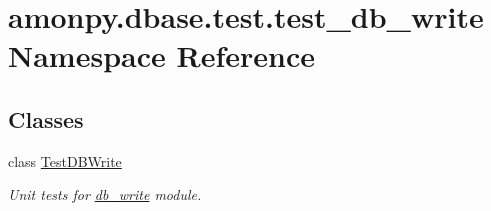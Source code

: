 \hypertarget{namespaceamonpy_1_1dbase_1_1test_1_1test__db__write}{\section{amonpy.\-dbase.\-test.\-test\-\_\-db\-\_\-write Namespace Reference}
\label{namespaceamonpy_1_1dbase_1_1test_1_1test__db__write}
}
\subsection*{Classes}
\begin{DoxyCompactItemize}
\item 
class \hyperlink{classamonpy_1_1dbase_1_1test_1_1test__db__write_1_1_test_d_b_write}{Test\-D\-B\-Write}
\begin{DoxyCompactList}\small\item\em Unit tests for \hyperlink{namespaceamonpy_1_1dbase_1_1db__write}{db\-\_\-write} module. \end{DoxyCompactList}\end{DoxyCompactItemize}
